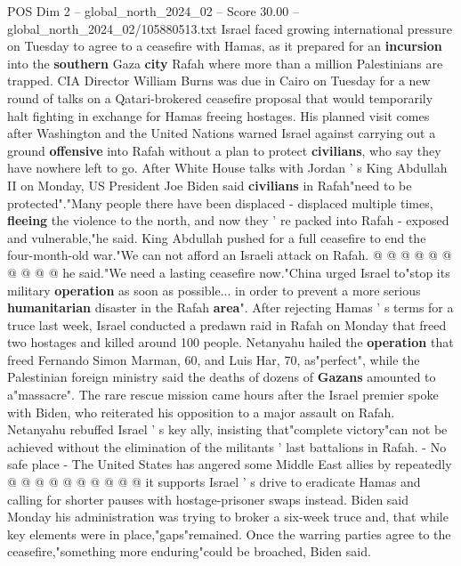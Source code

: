 \begin{textsample}{POS Dim 2 – global\_north\_2024\_02 – Score 30.00 – global\_north\_2024\_02/105880513.txt}  \label{ex:f2_pos_150}
Israel faced growing international pressure on Tuesday to agree to a ceasefire with Hamas, as it prepared for an \textbf{incursion} into the \textbf{southern} Gaza \textbf{city} Rafah where more than a million Palestinians are trapped.
CIA Director William Burns was due in Cairo on Tuesday for a new round of talks on a Qatari-brokered ceasefire proposal that would temporarily halt fighting in exchange for Hamas freeing hostages.
His planned visit comes after Washington and the United Nations warned Israel against carrying out a ground \textbf{offensive} into Rafah without a plan to protect \textbf{civilians}, who say they have nowhere left to go.
After White House talks with Jordan ' s King Abdullah II on Monday, US President Joe Biden said \textbf{civilians} in Rafah"need to be protected"."Many people there have been displaced - displaced multiple times, \textbf{fleeing} the violence to the north, and now they ' re packed into Rafah - exposed and vulnerable,"he said.
King Abdullah pushed for a full ceasefire to end the four-month-old war."We can not afford an Israeli attack on Rafah. @ @ @ @ @ @ @ @ @ @ he said."We need a lasting ceasefire now."China urged Israel to"stop its military \textbf{operation} as soon as possible... in order to prevent a more serious \textbf{humanitarian} disaster in the Rafah \textbf{area}".
After rejecting Hamas ' s terms for a truce last week, Israel conducted a predawn raid in Rafah on Monday that freed two hostages and killed around 100 people.
Netanyahu hailed the \textbf{operation} that freed Fernando Simon Marman, 60, and Luis Har, 70, as"perfect", while the Palestinian foreign ministry said the deaths of dozens of \textbf{Gazans} amounted to a"massacre".
The rare rescue mission came hours after the Israel premier spoke with Biden, who reiterated his opposition to a major assault on Rafah.
Netanyahu rebuffed Israel ' s key ally, insisting that"complete victory"can not be achieved without the elimination of the militants ' last battalions in Rafah. - No safe place - The United States has angered some Middle East allies by repeatedly @ @ @ @ @ @ @ @ @ @ it supports Israel ' s drive to eradicate Hamas and calling for shorter pauses with hostage-prisoner swaps instead.
Biden said Monday his administration was trying to broker a six-week truce and, that while key elements were in place,"gaps"remained.
Once the warring parties agree to the ceasefire,"something more enduring"could be broached, Biden said.

\end{textsample}
